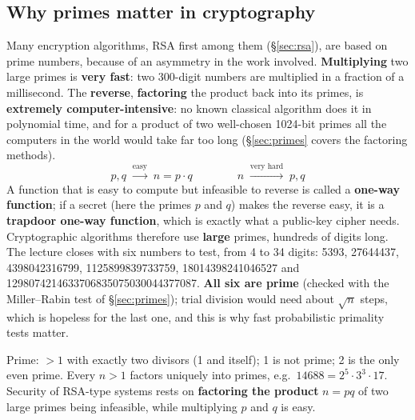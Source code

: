 \subsection{Why primes matter in cryptography}
Many encryption algorithms, RSA first among them (\S\ref{sec:rsa}), are based on prime numbers, because of an asymmetry in the work involved. \textbf{Multiplying} two large primes is \textbf{very fast}: two 300-digit numbers are multiplied in a fraction of a millisecond. The \textbf{reverse}, \textbf{factoring} the product back into its primes, is \textbf{extremely computer-intensive}: no known classical algorithm does it in polynomial time, and for a product of two well-chosen 1024-bit primes all the computers in the world would take far too long (\S\ref{sec:primes} covers the factoring methods).
\[
p, q \;\xrightarrow{\text{easy}}\; n = p \cdot q \qquad\qquad n \;\xrightarrow{\text{very hard}}\; p, q
\]
A function that is easy to compute but infeasible to reverse is called a \textbf{one-way function}; if a secret (here the primes $p$ and $q$) makes the reverse easy, it is a \textbf{trapdoor one-way function}, which is exactly what a public-key cipher needs. Cryptographic algorithms therefore use \textbf{large} primes, hundreds of digits long. The lecture closes with six numbers to test, from 4 to 34 digits: 5393, 27644437, 4398042316799, 1125899839733759, 18014398241046527 and 1298074214633706835075030044377087. \textbf{All six are prime} (checked with the Miller--Rabin test of \S\ref{sec:primes}); trial division would need about $\sqrt{n}$ steps, which is hopeless for the last one, and this is why fast probabilistic primality tests matter.

\begin{mustknow}[: primes]
Prime: $> 1$ with exactly two divisors (1 and itself); 1 is not prime; 2 is the only even prime. Every $n > 1$ factors uniquely into primes, e.g.\ $14688 = 2^5 \cdot 3^3 \cdot 17$.\\
Security of RSA-type systems rests on \textbf{factoring the product} $n = pq$ of two large primes being infeasible, while multiplying $p$ and $q$ is easy.
\end{mustknow}

